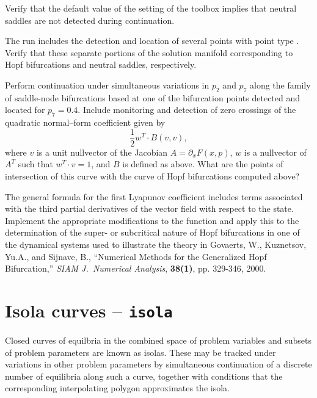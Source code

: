 \begin{exercises}

\item Verify that the default value of the  setting of the  toolbox implies that neutral saddles are not detected during continuation.

\item The  run includes the detection and location of several points with point type . Verify that these separate portions of the solution manifold corresponding to Hopf bifurcations and neutral saddles, respectively. 

\item Perform continuation under simultaneous variations in $p_2$ and $p_7$ along the family of saddle-node bifurcations based at one of the bifurcation points detected and located for $p_7=0.4$. Include monitoring and detection of zero crossings of the quadratic normal--form coefficient given by
\begin{equation}
\frac{1}{2}w^T\cdot B(v,v),
\end{equation}
where $v$ is a unit nullvector of the Jacobian $A=\partial_x F(x,p)$, $w$ is a nullvector of $A^T$ such that $w^T\cdot v=1$, and $B$ is defined as above. What are the points of intersection of this curve with the curve of Hopf bifurcations computed above?

\item The general formula for the first Lyapunov coefficient includes terms associated with the third partial derivatives of the vector field with respect to the state. Implement the appropriate modifications to the  function and apply this to the determination of the super- or subcritical nature of Hopf bifurcations in one of the dynamical systems used to illustrate the theory in Govaerts, W., Kuznetsov, Yu.A., and Sijnave, B., ``Numerical Methods for the Generalized Hopf Bifurcation,''  \emph{SIAM J.~Numerical Analysis}, \textbf{38(1)}, pp. 329-346, 2000.

\end{exercises}

\section{Isola curves -- \texttt{isola}}
Closed curves of equilbria in the combined space of problem variables and subsets of problem parameters are known as isolas. These may be tracked under variations in other problem parameters by simultaneous continuation of a discrete number of equilibria along such a curve, together with conditions that the corresponding interpolating polygon approximates the isola.

